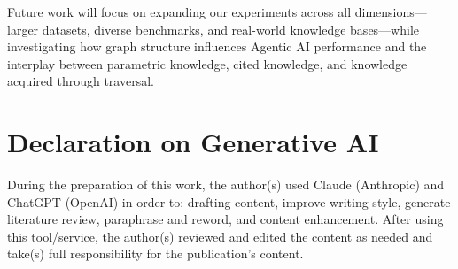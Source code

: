 \documentclass[
]{ceurart}
\begin{document}
Future work will focus on expanding our experiments across all dimensions—larger datasets, diverse benchmarks, and real-world knowledge bases—while investigating how graph structure influences Agentic AI performance and the interplay between parametric knowledge, cited knowledge, and knowledge acquired through traversal.


\section*{Declaration on Generative AI}

During the preparation of this work, the author(s) used Claude (Anthropic) and ChatGPT (OpenAI) in order to: drafting content, improve writing style, generate literature review, paraphrase and reword, and content enhancement. After using this tool/service, the author(s) reviewed and edited the content as needed and take(s) full responsibility for the publication's content.
  






\end{document}
